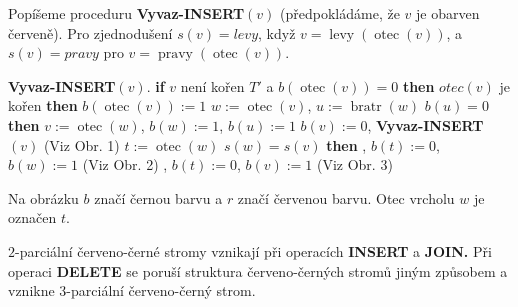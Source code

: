 \documentclass[a4paper,12pt]{article}
\DeclareMathOperator*{\otec}{otec}
\DeclareMathOperator*{\levy}{levy}
\DeclareMathOperator*{\pravy}{pravy}
\DeclareMathOperator*{\bratr}{bratr}
\begin{document}
Popíšeme proceduru {\bf Vyvaz-INSERT$(v)$} (předpokládáme, že 
$v$ je obarven červeně). Pro zjednodušení $s(v
)=levy$, když $v=\levy(\otec(v))$, a $s(v)=pravy$ pro  
$v=\pravy(\otec(v))$.

{\bf Vyvaz-INSERT$(v)$}.\newline 
{\bf if} $v$ není kořen $T'$ a $b(\otec(v))=0$ {\bf then}\newline 
\phantom{---}{\bf if} $otec(v)$ je kořen {\bf then}\newline 
\phantom{------}$b(\otec(v)):=1$\newline 
\phantom{---}{\bf else}\newline 
\phantom{------}$w:=\otec(v)$, $u:=\bratr(w)$\newline 
\phantom{------}{\bf if} $b(u)=0$ {\bf then}\newline 
\phantom{---------}$v:=\otec(w)$, $b(w):=1$, $b(u):=1$\newline 
\phantom{---------}$b(v):=0$, {\bf Vyvaz-INSERT$(v)$} (Viz Obr. 1)\newline 
\phantom{------}{\bf else}\newline 
\phantom{---------}$t:=\otec(w)$\newline 
\phantom{---------}{\bf if} $s(w)=s(v)$ {\bf then}\newline 
\phantom{------------}{\bf Rotace$(t,w)$}, $b(t):=0$, $b(w):=1$ (Viz Obr. 2)\newline 
\phantom{---------}{\bf else}\newline 
\phantom{------------}{\bf Dvojita-rotace$(t,w,v)$}, $b(t):=0$, $b(v):=1$ (Viz Obr. 3)\newline 
\phantom{---------}{\bf endif}\newline 
\phantom{------}{\bf endif}\newline 
\phantom{---}{\bf endif\newline 
endif}

Na obrázku $b$ značí černou barvu a $r$ značí červenou 
barvu. Otec vrcholu $w$ je označen $t$. 

\midinsert
\centerline{}
\endcaption
\endinsert

\midinsert
\centerline{}
\endcaption
\endinsert



\midinsert
\centerline{}
\endcaption
\endinsert

$2$-parciální červeno-černé stromy vznikají při 
operacích {\bf INSERT} a {\bf JOIN.}  Při operaci {\bf DELETE} se poruší 
struktura červeno-černých stromů jiným 
způsobem a vznikne 3-parciální červeno-čer\-ný strom.  
\end{document}

